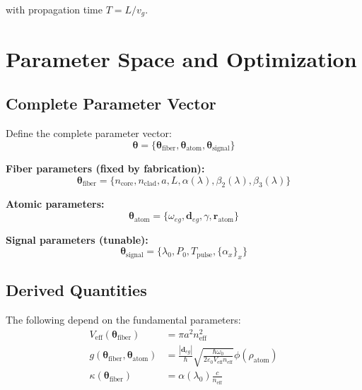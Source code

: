 \documentclass[12pt,a4paper]{article}
\begin{document}
with propagation time $T = L/v_g$.

\section{Parameter Space and Optimization}

\subsection{Complete Parameter Vector}

Define the complete parameter vector:
\begin{equation}
\boldsymbol{\theta} = \{\boldsymbol{\theta}_{\text{fiber}}, \boldsymbol{\theta}_{\text{atom}}, \boldsymbol{\theta}_{\text{signal}}\}
\end{equation}

\textbf{Fiber parameters (fixed by fabrication):}
\begin{equation}
\boldsymbol{\theta}_{\text{fiber}} = \{n_{\text{core}}, n_{\text{clad}}, a, L, \alpha(\lambda), \beta_2(\lambda), \beta_3(\lambda)\}
\end{equation}

\textbf{Atomic parameters:}
\begin{equation}
\boldsymbol{\theta}_{\text{atom}} = \{\omega_{eg}, \mathbf{d}_{eg}, \gamma, \mathbf{r}_{\text{atom}}\}
\end{equation}

\textbf{Signal parameters (tunable):}
\begin{equation}
\boldsymbol{\theta}_{\text{signal}} = \{\lambda_0, P_0, T_{\text{pulse}}, \{\alpha_x\}_{x}\}
\end{equation}

\subsection{Derived Quantities}

The following depend on the fundamental parameters:
\begin{align}
V_{\text{eff}}(\boldsymbol{\theta}_{\text{fiber}}) &= \pi a^2 n_{\text{eff}}^2\\
g(\boldsymbol{\theta}_{\text{fiber}}, \boldsymbol{\theta}_{\text{atom}}) &= \frac{|\mathbf{d}_{eg}|}{\hbar}\sqrt{\frac{\hbar\omega_0}{2\varepsilon_0 V_{\text{eff}} n_{\text{eff}}}} \phi(\rho_{\text{atom}})\\
\kappa(\boldsymbol{\theta}_{\text{fiber}}) &= \alpha(\lambda_0) \frac{c}{n_{\text{eff}}}
\end{align}
\end{document}

